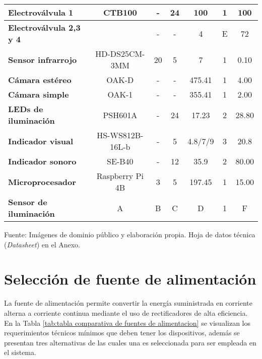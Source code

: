 \begin{mytable}[H]
\begin{tabular}{l|c|c|c|c|c|c|}
		\multicolumn{1}{|l|}{\cellcolor[HTML]{C0C0C0}\textbf{Electroválvula 1}} & CTB100 & - & 24 & 100 & 1 & 100 \\ \hline
		\multicolumn{1}{|l|}{\cellcolor[HTML]{C0C0C0}\textbf{Electroválvula 2,3 y 4}} &  & - & - & 4 & E & 72 \\ \hline
		\multicolumn{1}{|l|}{\cellcolor[HTML]{C0C0C0}\textbf{Sensor infrarrojo}} & HD-DS25CM-3MM & 20 & 5 & 7 & 1 & 0.10 \\ \hline
		\multicolumn{1}{|l|}{\cellcolor[HTML]{C0C0C0}\textbf{Cámara estéreo}} & OAK-D & - & - & 475.41 & 1 & 4.00 \\ \hline
		\multicolumn{1}{|l|}{\cellcolor[HTML]{C0C0C0}\textbf{Cámara simple}} & OAK-1 & - & - & 355.41 & 1 & 2.00 \\ \hline
		\multicolumn{1}{|l|}{\cellcolor[HTML]{C0C0C0}\textbf{LEDs de iluminación}} & PSH601A & - & 24 & 17.23 & 2 & 28.80 \\ \hline
		\multicolumn{1}{|l|}{\cellcolor[HTML]{C0C0C0}\textbf{Indicador visual}} & HS-WS812B-16L-b & - & 5 & 4.8/7/9 & 3 & 20.8 \\ \hline
		\multicolumn{1}{|l|}{\cellcolor[HTML]{C0C0C0}\textbf{Indicador sonoro}} & SE-B40 & - & 12 & 35.9 & 2 & 80.00 \\ \hline
		\multicolumn{1}{|l|}{\cellcolor[HTML]{C0C0C0}\textbf{Microprocesador}} & Raspberry Pi 4B & 3 & 5 & 197.45 & 1 & 15.00 \\ \hline
		\multicolumn{1}{|l|}{\cellcolor[HTML]{C0C0C0}\textbf{Sensor de iluminación}} & A & B & C & D & 1 & F \\ \hline
	\end{tabular}
	\begin{myflushcenteraftertable}	
		Fuente: Imágenes de dominio público y elaboración propia. Hoja de datos técnica (\textit{Datasheet}) en el Anexo.
	\end{myflushcenteraftertable}
\end{mytable}


\section{Selección de fuente de alimentación} 

La fuente de alimentación permite convertir la energía suministrada en corriente alterna a corriente continua mediante el uso de rectificadores de alta eficiencia. En la Tabla \ref{tab:tabla comparativa de fuentes de alimentacion} se visualizan los requerimientos técnicos mínimos que deben tener los dispositivos, además se presentan tres alternativas de las cuales una es seleccionada para ser empleada en el sistema.

